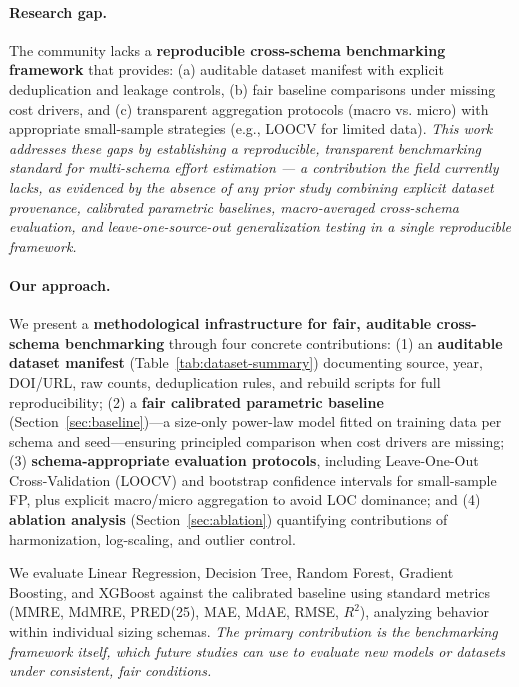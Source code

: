 \documentclass{ieeeaccess}
\begin{document}
\paragraph{Research gap.}
The community lacks a \textbf{reproducible cross-schema benchmarking framework} that provides: (a) auditable dataset manifest with explicit deduplication and leakage controls, (b) fair baseline comparisons under missing cost drivers, and (c) transparent aggregation protocols (macro vs. micro) with appropriate small-sample strategies (e.g., LOOCV for limited data). \textit{This work addresses these gaps by establishing a reproducible, transparent benchmarking standard for multi-schema effort estimation --- a contribution the field currently lacks, as evidenced by the absence of any prior study combining explicit dataset provenance, calibrated parametric baselines, macro-averaged cross-schema evaluation, and leave-one-source-out generalization testing in a single reproducible framework.}

\paragraph{Our approach.}
We present a \textbf{methodological infrastructure for fair, auditable cross-schema benchmarking} through four concrete contributions: 
(1) an \textbf{auditable dataset manifest} (Table~\ref{tab:dataset-summary}) documenting source, year, DOI/URL, raw counts, deduplication rules, and rebuild scripts for full reproducibility; 
(2) a \textbf{fair calibrated parametric baseline} (Section~\ref{sec:baseline})---a size-only power-law model fitted on training data per schema and seed---ensuring principled comparison when cost drivers are missing; 
(3) \textbf{schema-appropriate evaluation protocols}, including Leave-One-Out Cross-Validation (LOOCV) and bootstrap confidence intervals for small-sample FP, plus explicit macro/micro aggregation to avoid LOC dominance; and 
(4) \textbf{ablation analysis} (Section~\ref{sec:ablation}) quantifying contributions of harmonization, log-scaling, and outlier control.

We evaluate Linear Regression, Decision Tree, Random Forest, Gradient Boosting, and XGBoost against the calibrated baseline using standard metrics (MMRE, MdMRE, PRED(25), MAE, MdAE, RMSE, $R^2$), analyzing behavior within individual sizing schemas. \textit{The primary contribution is the benchmarking framework itself, which future studies can use to evaluate new models or datasets under consistent, fair conditions.}
\end{document}
